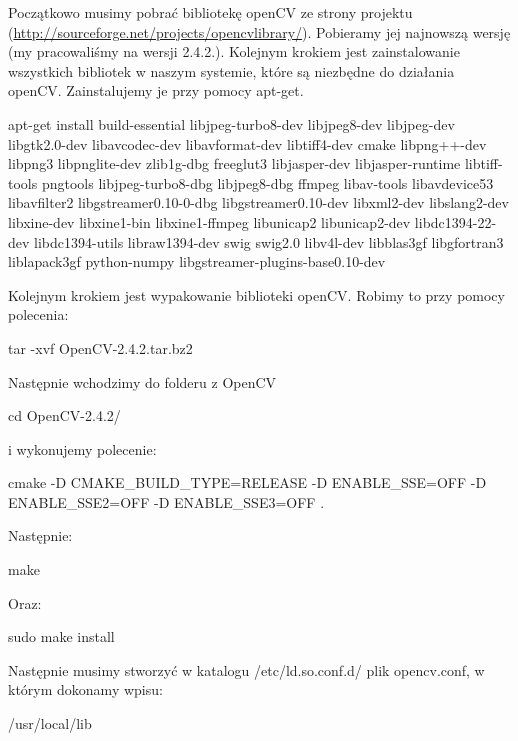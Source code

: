 \documentclass[a4paper, twoside]{article}
\begin{document}
Początkowo musimy pobrać bibliotekę openCV ze strony projektu \\(\href{http://sourceforge.net/projects/opencvlibrary/}{http://sourceforge.net/projects/opencvlibrary/}). Pobieramy jej najnowszą wersję (my pracowaliśmy na wersji 2.4.2.).
\newline
Kolejnym krokiem jest zainstalowanie wszystkich bibliotek w naszym systemie, które są niezbędne do działania openCV. Zainstalujemy je przy pomocy apt-get. 
\begin{center}
apt-get install build-essential libjpeg-turbo8-dev libjpeg8-dev libjpeg-dev libgtk2.0-dev libavcodec-dev libavformat-dev libtiff4-dev cmake libpng++-dev libpng3
libpnglite-dev
zlib1g-dbg
freeglut3 libjasper-dev libjasper-runtime
libtiff-tools pngtools
libjpeg-turbo8-dbg libjpeg8-dbg
ffmpeg libav-tools libavdevice53 libavfilter2
libgstreamer0.10-0-dbg libgstreamer0.10-dev libxml2-dev
libslang2-dev libxine-dev libxine1-bin libxine1-ffmpeg
libunicap2 libunicap2-dev
libdc1394-22-dev libdc1394-utils libraw1394-dev
swig swig2.0
 libv4l-dev
libblas3gf libgfortran3 liblapack3gf python-numpy
libgstreamer-plugins-base0.10-dev
\end{center}

Kolejnym krokiem jest wypakowanie biblioteki openCV. Robimy to przy pomocy polecenia: 

 \begin{center}tar -xvf OpenCV-2.4.2.tar.bz2\end{center}

Następnie wchodzimy do folderu z OpenCV

\begin{center}cd OpenCV-2.4.2/\end{center}

i wykonujemy polecenie:

\begin{center}cmake -{}D CMAKE\_BUILD\_TYPE=RELEASE -D ENABLE\_SSE=OFF -D ENABLE\_SSE2=OFF -D ENABLE\_SSE3=OFF . \end{center}
Następnie:
\begin{center}make\end{center}
Oraz:
\begin{center}sudo make install\end{center}

Następnie musimy stworzyć w katalogu /etc/ld.so.conf.d/ plik opencv.conf, w którym dokonamy wpisu:

\begin{center}/usr/local/lib\end{center}
\end{document}
